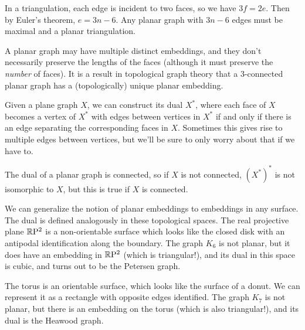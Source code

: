 
In a triangulation, each edge is incident to two faces, so we have $3f=2e$.  Then by Euler's theorem, $e=3n-6$.  Any planar graph with $3n-6$ edges must be maximal and a planar triangulation.

A planar graph may have multiple distinct embeddings, and they don't necessarily preserve the lengths of the faces (although it must preserve the \textit{number} of faces).  It is a result in topological graph theory that a $3$-connected planar graph has a (topologically) unique planar embedding.

Given a plane graph $X$, we can construct its dual $X^*$, where each face of $X$ becomes a vertex of $X^*$ with edges between vertices in $X^*$ if and only if there is an edge separating the corresponding faces in $X$.  Sometimes this gives rise to multiple edges between vertices, but we'll be sure to only worry about that if we have to.

The dual of a planar graph is connected, so if $X$ is not connected, $(X^*)^*$ is not isomorphic to $X$, but this is true if $X$ is connected.

We can generalize the notion of planar embeddings to embeddings in any surface.  The  dual is defined analogously in these topological spaces.  The real projective plane $\mathbb{R}\mathrm{P}^2$ is a non-orientable surface which looks like the closed disk with an antipodal identification along the boundary.  The graph $K_6$ is not planar, but it does have an embedding in $\mathbb{R}\mathrm{P}^2$ (which is triangular!), and its dual in this space is cubic, and turns out to be the Petersen graph.

The torus is an orientable surface, which looks like the surface of a donut.  We can represent it as a rectangle with opposite edges identified.  The graph $K_7$ is not planar, but there is an embedding on the torus (which is also triangular!), and its dual is the Heawood graph.


\ifdraft

\fi
